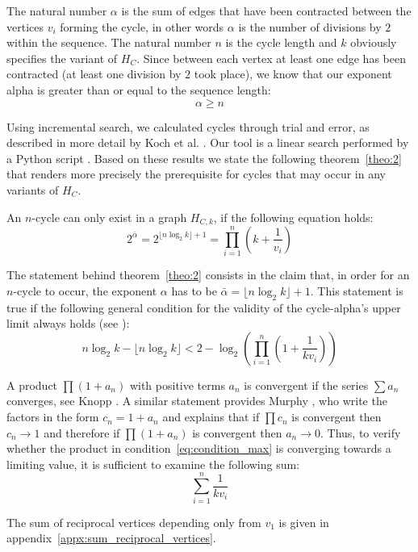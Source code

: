 The natural number $\alpha$ is the sum of edges that have been contracted between the vertices $v_i$ forming the cycle, in other words $\alpha$ is the number of divisions by $2$ within the sequence. The natural number $n$ is the cycle length and $k$ obviously specifies the variant of $H_C$. Since between each vertex at least one edge has been contracted (at least one division by $2$ took place), we know that our exponent alpha is greater than or equal to the sequence length:
\begin{equation}
\label{eq:n_alpha}
\alpha\ge n
\end{equation}

Using incremental search, we calculated cycles through trial and error, as described in more detail by Koch et al. \cite{Ref_Koch_2020}. Our tool is a linear search performed by a Python script \cite{Ref_Koch_Github}. Based on these results we state the following theorem~\ref{theo:2} that renders more precisely the prerequisite for cycles that may occur in any variants of $H_C$.

\begin{theorem}
	\label{theo:2}
	An $n$-cycle can only exist in a graph $H_{C,k}$, if the following equation holds:
	\begin{equation*}
	2^{\bar\alpha}=2^{\lfloor n\log_2k\rfloor+1}=\prod_{i=1}^{n}\left(k+\frac{1}{v_i}\right)
	\end{equation*}
\end{theorem}

The statement behind theorem~\ref{theo:2} consists in the claim that, in order for an $n$-cycle to occur, the exponent $\alpha$ has to be $\bar\alpha=\lfloor n\log_2k\rfloor+1$. This statement is true if the following general condition for the validity of the cycle-alpha's upper limit always holds (see \cite{Ref_Koch_2020}):
\begin{equation}
\label{eq:condition_max}
n\log_2k-\lfloor n\log_2k\rfloor<2-\log_2\left(\prod_{i=1}^{n}\left(1+\frac{1}{kv_{i}}\right)\right)
\end{equation}

A product $\prod(1+a_n)$ with positive terms $a_n$ is convergent if the series $\sum a_n$ converges, see Knopp \cite[p.~220]{Ref_Knopp}. A similar statement provides Murphy \cite{Ref_Murphy}, who write the factors in the form $c_n=1+a_n$ and explains that if $\prod c_n$ is convergent then $c_n\rightarrow1$ and therefore if $\prod (1+a_n)$ is convergent then $a_n\rightarrow0$. Thus, to verify whether the product in condition~\ref{eq:condition_max} is converging towards a limiting value, it is sufficient to examine the following sum:
\begin{equation*}
\sum_{i=1}^{n}\frac{1}{kv_{i}}
\end{equation*}

The sum of reciprocal vertices depending only from $v_1$ is given in appendix~\ref{appx:sum_reciprocal_vertices}.
